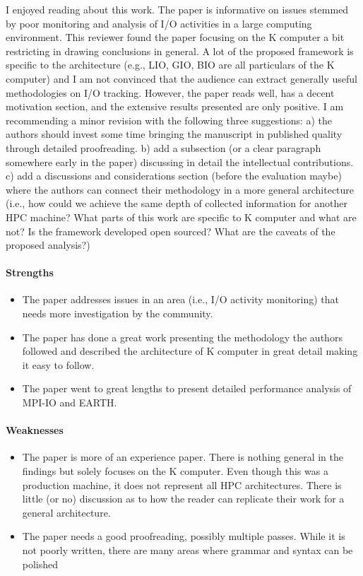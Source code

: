 \documentclass{jhps}
\begin{document}
I enjoyed reading about this work. The paper is informative on issues stemmed by poor monitoring and analysis of I/O activities in a large computing environment. This reviewer found the paper focusing on the K computer a bit restricting in drawing conclusions in general. A lot of the proposed framework is specific to the architecture (e.g., LIO, GIO, BIO are all particulars of the K computer) and I am not convinced that the audience can extract generally useful methodologies on I/O tracking. However, the paper reads well, has a decent motivation section, and the extensive results presented are only positive. I am recommending a minor revision with the following three suggestions: a) the authors should invest some time bringing the manuscript in published quality through detailed proofreading. b) add a subsection (or a clear paragraph somewhere early in the paper) discussing in detail the intellectual contributions. c) add a discussions and considerations section (before the evaluation maybe) where the authors can connect their methodology in a more general architecture (i.e., how could we achieve the same depth of collected information for another HPC machine? What parts of this work are specific to K computer and what are not?  Is the framework developed open sourced? What are the caveats of the proposed analysis?)

\paragraph{Strengths}

\begin{itemize}
\item The paper addresses issues in an area (i.e., I/O activity monitoring) that needs more investigation by the community.
\item  The paper has done a great work presenting the methodology the authors followed and described the architecture of K computer in great detail making it easy to follow. 
\item  The paper went to great lengths to present detailed performance analysis of MPI-IO and EARTH.
\end{itemize}

\paragraph{Weaknesses}

\begin{itemize}
\item The paper is more of an experience paper. There is nothing general in the findings but solely focuses on the K computer. Even though this was a production machine, it does not represent all HPC architectures. There is little (or no) discussion as to how the reader can replicate their work for a general architecture. 
\item The paper needs a good proofreading, possibly multiple passes. While it is not poorly written, there are many areas where grammar and syntax can be polished 
\end{itemize}
\end{document}
